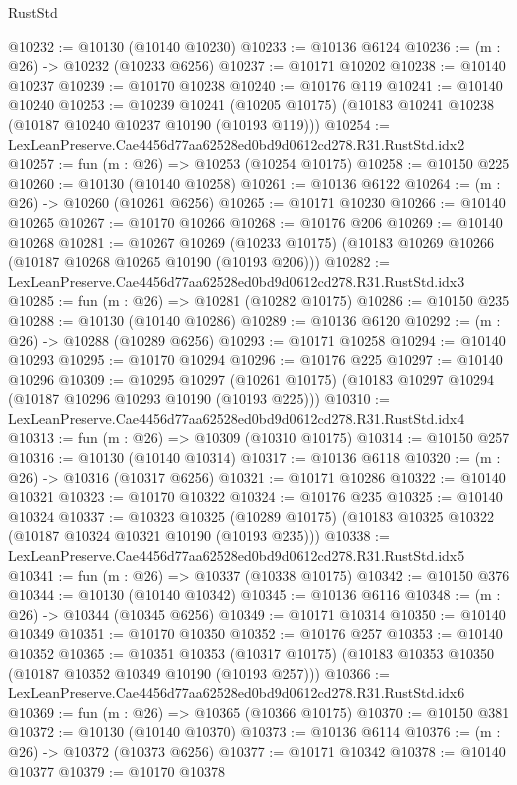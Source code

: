 \begin{lexlean}{RustStd}
\begin{coremodule}
@10232 := @10130 (@10140 @10230)
@10233 := @10136 @6124
@10236 := (m : @26) -> @10232 (@10233 @6256)
@10237 := @10171 @10202
@10238 := @10140 @10237
@10239 := @10170 @10238
@10240 := @10176 @119
@10241 := @10140 @10240
@10253 := @10239
    @10241
    (@10205 @10175)
    (@10183 @10241 @10238 (@10187 @10240 @10237 @10190 (@10193 @119)))
@10254 := LexLeanPreserve.Cae4456d77aa62528ed0bd9d0612cd278.R31.RustStd.idx2
@10257 := fun (m : @26) => @10253 (@10254 @10175)
@10258 := @10150 @225
@10260 := @10130 (@10140 @10258)
@10261 := @10136 @6122
@10264 := (m : @26) -> @10260 (@10261 @6256)
@10265 := @10171 @10230
@10266 := @10140 @10265
@10267 := @10170 @10266
@10268 := @10176 @206
@10269 := @10140 @10268
@10281 := @10267
    @10269
    (@10233 @10175)
    (@10183 @10269 @10266 (@10187 @10268 @10265 @10190 (@10193 @206)))
@10282 := LexLeanPreserve.Cae4456d77aa62528ed0bd9d0612cd278.R31.RustStd.idx3
@10285 := fun (m : @26) => @10281 (@10282 @10175)
@10286 := @10150 @235
@10288 := @10130 (@10140 @10286)
@10289 := @10136 @6120
@10292 := (m : @26) -> @10288 (@10289 @6256)
@10293 := @10171 @10258
@10294 := @10140 @10293
@10295 := @10170 @10294
@10296 := @10176 @225
@10297 := @10140 @10296
@10309 := @10295
    @10297
    (@10261 @10175)
    (@10183 @10297 @10294 (@10187 @10296 @10293 @10190 (@10193 @225)))
@10310 := LexLeanPreserve.Cae4456d77aa62528ed0bd9d0612cd278.R31.RustStd.idx4
@10313 := fun (m : @26) => @10309 (@10310 @10175)
@10314 := @10150 @257
@10316 := @10130 (@10140 @10314)
@10317 := @10136 @6118
@10320 := (m : @26) -> @10316 (@10317 @6256)
@10321 := @10171 @10286
@10322 := @10140 @10321
@10323 := @10170 @10322
@10324 := @10176 @235
@10325 := @10140 @10324
@10337 := @10323
    @10325
    (@10289 @10175)
    (@10183 @10325 @10322 (@10187 @10324 @10321 @10190 (@10193 @235)))
@10338 := LexLeanPreserve.Cae4456d77aa62528ed0bd9d0612cd278.R31.RustStd.idx5
@10341 := fun (m : @26) => @10337 (@10338 @10175)
@10342 := @10150 @376
@10344 := @10130 (@10140 @10342)
@10345 := @10136 @6116
@10348 := (m : @26) -> @10344 (@10345 @6256)
@10349 := @10171 @10314
@10350 := @10140 @10349
@10351 := @10170 @10350
@10352 := @10176 @257
@10353 := @10140 @10352
@10365 := @10351
    @10353
    (@10317 @10175)
    (@10183 @10353 @10350 (@10187 @10352 @10349 @10190 (@10193 @257)))
@10366 := LexLeanPreserve.Cae4456d77aa62528ed0bd9d0612cd278.R31.RustStd.idx6
@10369 := fun (m : @26) => @10365 (@10366 @10175)
@10370 := @10150 @381
@10372 := @10130 (@10140 @10370)
@10373 := @10136 @6114
@10376 := (m : @26) -> @10372 (@10373 @6256)
@10377 := @10171 @10342
@10378 := @10140 @10377
@10379 := @10170 @10378

\end{coremodule}
\end{lexlean}
